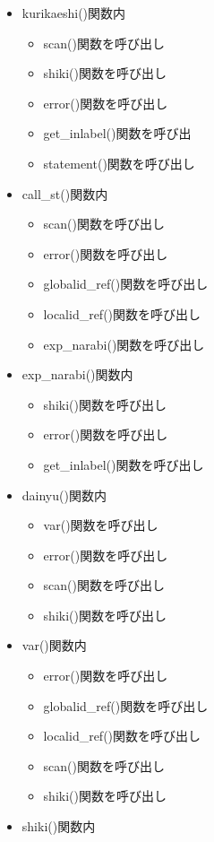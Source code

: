 \documentclass{jarticle}
\begin{document}
\begin{itemize}
\begin{itemize}
    \item kurikaeshi()関数内
    \begin{itemize}
      \item scan()関数を呼び出し
      \item shiki()関数を呼び出し
      \item error()関数を呼び出し
      \item get\_inlabel()関数を呼び出
      \item statement()関数を呼び出し
    \end{itemize}
    \item call\_st()関数内
    \begin{itemize}
      \item scan()関数を呼び出し
      \item error()関数を呼び出し
      \item globalid\_ref()関数を呼び出し
      \item localid\_ref()関数を呼び出し
      \item exp\_narabi()関数を呼び出し
    \end{itemize}
    \item exp\_narabi()関数内
    \begin{itemize}
      \item shiki()関数を呼び出し
      \item error()関数を呼び出し
      \item get\_inlabel()関数を呼び出し
    \end{itemize}
    \item dainyu()関数内
    \begin{itemize}
      \item var()関数を呼び出し
      \item error()関数を呼び出し
      \item scan()関数を呼び出し
      \item shiki()関数を呼び出し
    \end{itemize}
    \item var()関数内
    \begin{itemize}
      \item error()関数を呼び出し
      \item globalid\_ref()関数を呼び出し
      \item localid\_ref()関数を呼び出し
      \item scan()関数を呼び出し
      \item shiki()関数を呼び出し
    \end{itemize}
    \item shiki()関数内

\end{itemize}
\end{itemize}
\end{document}

